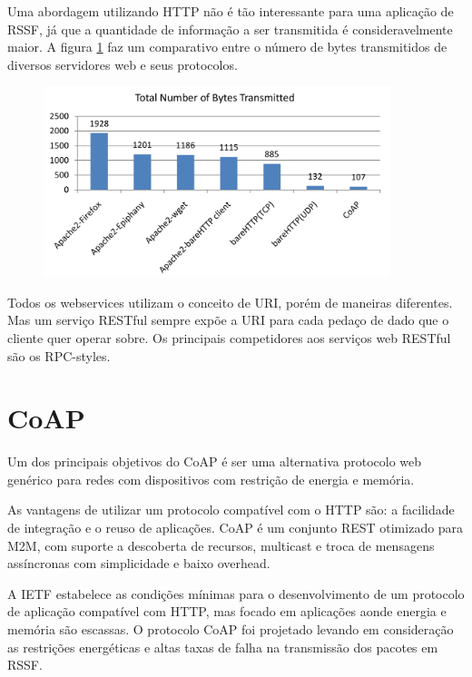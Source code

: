 Uma abordagem utilizando HTTP n\~ao \'e t\~ao interessante para uma aplica\c{c}\~ao de RSSF, j\'a que a quantidade de informa\c{c}\~ao a ser transmitida \'e consideravelmente maior. A figura \ref{bytesTransmitted} faz um comparativo entre o n\'umero de bytes transmitidos de diversos servidores web e seus protocolos.

\begin{figure}[h]
    \label{bytesTransmitted}
    \centering
    \includegraphics[width=0.9\textwidth]{figuras/bytestransmitted.png}
    \caption{\cite{transportApp}}
\end{figure}

Todos os webservices utilizam o conceito de URI, por\'em de maneiras diferentes. Mas um servi\c{c}o RESTful sempre exp\~oe a URI para cada peda\c{c}o de dado que o cliente quer operar sobre. Os principais competidores aos servi\c{c}os web RESTful s\~ao os RPC-styles.


\section{CoAP}

Um dos principais objetivos do CoAP \'e ser uma alternativa protocolo web gen\'erico para redes com dispositivos com restri\c{c}\~ao de energia e mem\'oria.

As vantagens de utilizar um protocolo compat\'ivel com o HTTP s\~ao: a facilidade de integra\c{c}\~ao e o reuso de aplica\c{c}\~oes. CoAP \'e um conjunto REST otimizado para M2M, com suporte a descoberta de recursos, multicast e troca de mensagens ass\'incronas com simplicidade e baixo overhead.

A IETF estabelece as condi\c{c}\~oes m\'inimas para o desenvolvimento de um protocolo de aplica\c{c}\~ao compat\'ivel com HTTP, mas focado em aplica\c{c}\~oes aonde energia e mem\'oria s\~ao escassas. O protocolo CoAP foi projetado levando em considera\c{c}\~ao as restri\c{c}\~oes energ\'eticas e altas taxas de falha na transmiss\~ao dos pacotes em RSSF.

